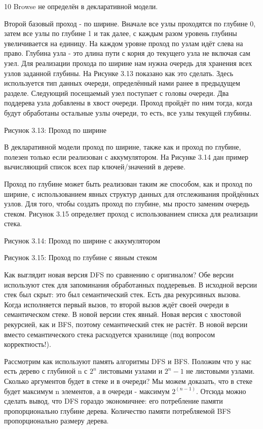 10 Browse не определён в декларативной модели.

Второй базовый проход - по ширине. Вначале все узлы проходятся по глубине 0, затем все узлы по глубине 1 и так далее, с каждым разом уровень глубины увеличивается на единицу. На каждом уровне проход по узлам идёт слева на право. Глубина узла - это длина пути с корня до текущего узла не включая сам узел. Для реализации прохода по ширине нам нужна очередь для хранения всех узлов заданной глубины. На Рисунке 3.13 показано как это сделать. Здесь используется тип данных очереди, определённый нами ранее в предыдущем разделе. Следующий посещаемый узел поступает с головы очереди. Два поддерева узла добавлены в хвост очереди. Проход пройдёт по ним тогда, когда будут обработаны остальные узлы очереди, то есть, все узлы текущей глубины.

Рисунок 3.13: Проход по ширине

В декларативной модели проход по ширине, также как и проход по глубине, полезен только если реализован с аккумулятором. На Рисунке 3.14 дан пример вычисляющий список всех пар ключей/значений в дереве.

Проход по глубине может быть реализован таким же способом, как и проход по ширине, с использованием явных структур данных для отслеживания пройдённых узлов. Для того, чтобы создать проход по глубине, мы просто заменим очередь стеком. Рисунок 3.15 определяет проход с использованием списка для реализации стека.

Рисунок 3.14: Проход по ширине с аккумулятором

Рисунок 3.15: Проход по глубине с явным стеком

Как выглядит новая версия DFS по сравнению с оригиналом? Обе версии используют стек для запоминания обработанных поддеревьев. В исходной версии стек был скрыт: это был семантический стек. Есть два рекурсивных вызова. Когда исполняется первый вызов, то второй вызов ждёт своей очереди в семантическом стеке. В новой версии стек явный. Новая версия с хвостовой рекурсией, как и BFS, поэтому семантический стек не растёт. В новой версии вместо семантического стека расходуется хранилище (под вопросом корректность!).

Рассмотрим как используют память алгоритмы DFS и BFS. Положим что у нас есть дерево с глубиной n с $2^n$ листовыми узлами и $2^n-1$ не листовыми узлами. Сколько аргументов будет в стеке и в очереди? Мы можем доказать, что в стеке будет максимум n элементов, а в очереди - максимум $2^(n-1)$. Отсюда можно сделать вывод, что DFS гораздо экономичнее: его потребление памяти пропорционально глубине дерева. Количество памяти потребляемой BFS пропорционально размеру дерева.

